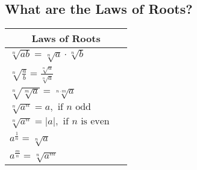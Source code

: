 \subsection{What are the Laws of Roots?}

\begin{tabularx}{1\textwidth}{
        p{}
        p{}
    }
    \toprule
    \multicolumn{2}{c}{\textbf{Laws of Roots}} \\
    \midrule
    $ \sqrt[n]{ab} = \sqrt[n]{a} \cdot \sqrt[n]{b} $ & \\
    \midrule

    $ \sqrt[n]{ \frac{a}{b} } = \frac{ \sqrt[n]{a} }{ \sqrt[n]{a} } $ & \\
    \midrule

    $ \sqrt[n]{ \sqrt[m]{a}} = \sqrt[n \cdot m]{a} $ & \\
    \midrule

    $ \sqrt[n]{ a^{n} } = a, \text{ if } n \text{ odd } $ & \\
    \midrule

    $ \sqrt[n]{ a^{n} } = \lvert a \rvert, \text{ if } n \text{ is even } $ &
    \\
    \midrule

    $ a^{ \frac{1}{n} } = \sqrt[n]{a} $ & \\
    \midrule

    $ a^{ \frac{m}{n} } = \sqrt[n]{ a^{m} } $ & \\
    \bottomrule
\end{tabularx}
